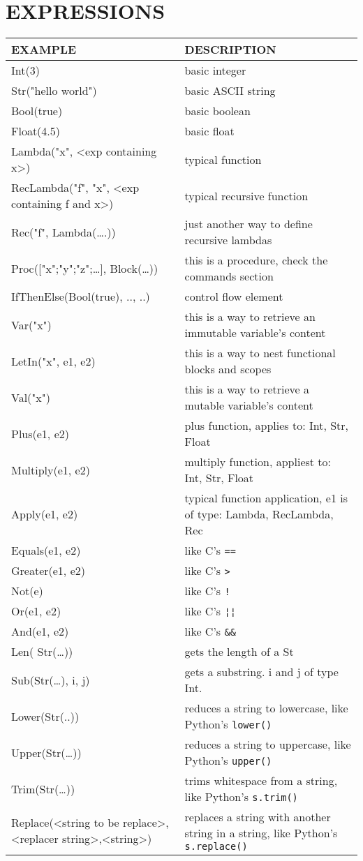 \documentclass[11pt]{report}
\begin{document}
\chapter{EXPRESSIONS}
\label{sec:org9b9bccb}
\begin{center}
\begin{tabularx}{\textwidth}{lX}
EXAMPLE & DESCRIPTION\\
\hline
Int(3) & basic integer\\
Str("hello world") & basic ASCII string\\
Bool(true) & basic boolean\\
Float(4.5) & basic float\\
Lambda("x", <exp containing x>) & typical function\\
RecLambda("f", "x", <exp containing f and x>) & typical recursive function\\
Rec("f", Lambda(\ldots{}.)) & just another way to define recursive lambdas\\
Proc(["x";"y";"z";\ldots{}], Block(\ldots{})) & this is a procedure, check the commands section\\
IfThenElse(Bool(true), .., ..) & control flow element\\
Var("x") & this is a way to retrieve an immutable variable's content\\
LetIn("x", e1, e2) & this is a way to nest functional blocks and scopes\\
Val("x") & this is a way to retrieve a mutable variable's content\\
Plus(e1, e2) & plus function, applies to: Int, Str, Float\\
Multiply(e1, e2) & multiply function, appliest to: Int, Str, Float\\
Apply(e1, e2) & typical function application, e1 is of type: Lambda, RecLambda, Rec\\
Equals(e1, e2) & like C's \texttt{==}\\
Greater(e1, e2) & like C's \texttt{>}\\
Not(e) & like C's \texttt{!}\\
Or(e1, e2) & like C's \texttt{¦¦}\\
And(e1, e2) & like C's \texttt{\&\&}\\
Len( Str(\ldots{})) & gets the length of a St\\
Sub(Str(\ldots{}), i, j) & gets a substring. i and j of type Int.\\
Lower(Str(..)) & reduces a string to lowercase, like Python's \texttt{lower()}\\
Upper(Str(\ldots{})) & reduces a string to uppercase, like Python's \texttt{upper()}\\
Trim(Str(\ldots{})) & trims whitespace from a string, like Python's \texttt{s.trim()}\\
Replace(<string to be replace>,<replacer string>,<string>) & replaces a string with another string in a string, like Python's \texttt{s.replace()}\\
\end{tabularx}
\end{center}
\end{document}

